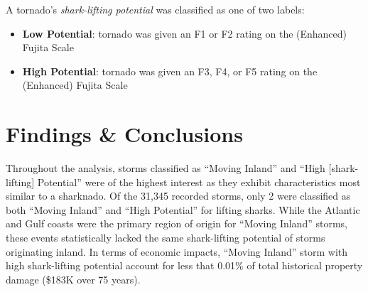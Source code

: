 \documentclass[
  letterpaper,
  DIV=11,
  numbers=noendperiod]{scrreprt}
\providecommand{\tightlist}{%
  \setlength{\itemsep}{0pt}\setlength{\parskip}{0pt}}
\begin{document}
A tornado's \emph{shark-lifting potential} was classified as one of two
labels:

\begin{itemize}
\tightlist
\item
  \textbf{Low Potential}: tornado was given an F1 or F2 rating on the
  (Enhanced) Fujita Scale
\item
  \textbf{High Potential}: tornado was given an F3, F4, or F5 rating on
  the (Enhanced) Fujita Scale
\end{itemize}

\section*{Findings \& Conclusions}\label{findings-conclusions}


Throughout the analysis, storms classified as ``Moving Inland'' and
``High {[}shark-lifting{]} Potential'' were of the highest interest as
they exhibit characteristics most similar to a sharknado. Of the 31,345
recorded storms, only 2 were classified as both ``Moving Inland'' and
``High Potential'' for lifting sharks. While the Atlantic and Gulf
coasts were the primary region of origin for ``Moving Inland'' storms,
these events statistically lacked the same shark-lifting potential of
storms originating inland. In terms of economic impacts, ``Moving
Inland'' storm with high shark-lifting potential account for less that
0.01\% of total historical property damage (\$183K over 75 years).
\end{document}
